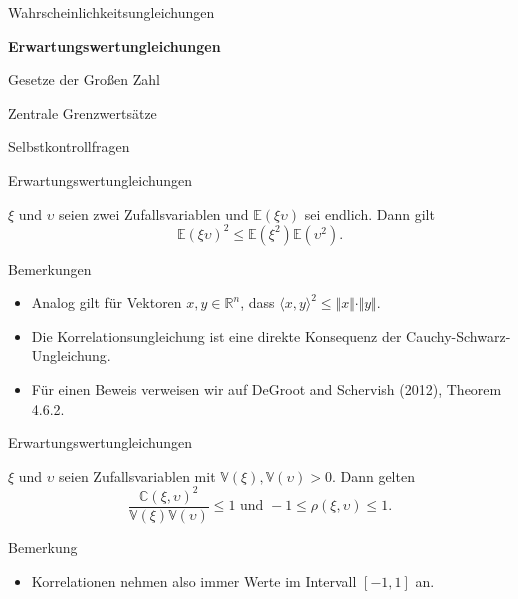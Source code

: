 \documentclass[
  8pt,
  ignorenonframetext,
]{beamer}
\providecommand{\tightlist}{%
  \setlength{\itemsep}{0pt}\setlength{\parskip}{0pt}}
\newcommand{\ups}{\upsilon}
\begin{document}
\begin{frame}{}
\protect\hypertarget{section-4}{}
\large
\vfill
{}

Wahrscheinlichkeitsungleichungen

\textbf{Erwartungswertungleichungen}

Gesetze der Großen Zahl

Zentrale Grenzwertsätze

Selbstkontrollfragen \vfill
\end{frame}

\begin{frame}{Erwartungswertungleichungen}
\protect\hypertarget{erwartungswertungleichungen}{}
\small
\begin{theorem}
\normalfont
\justifying
$\xi$ und $\ups$ seien zwei Zufallsvariablen und $\mathbb{E}(\xi\ups)$ sei endlich.
Dann gilt
\begin{equation}
\mathbb{E}(\xi\ups)^2 \le \mathbb{E}\left(\xi^2\right)\mathbb{E}\left(\ups^2 \right).
\end{equation}
\end{theorem}

Bemerkungen

\begin{itemize}
\tightlist
\item
  Analog gilt für Vektoren \(x,y \in \mathbb{R}^n\), dass
  \(\langle x,y \rangle^2 \le \Vert x \Vert \cdot \Vert y \Vert\).
\item
  Die Korrelationsungleichung ist eine direkte Konsequenz der
  Cauchy-Schwarz-Ungleichung.
\item
  Für einen Beweis verweisen wir auf DeGroot and Schervish (2012),
  Theorem 4.6.2.
\end{itemize}
\end{frame}

\begin{frame}{Erwartungswertungleichungen}
\protect\hypertarget{erwartungswertungleichungen-1}{}
\small
\begin{theorem}[Korrelationsungleichung]
\justifying
\normalfont
$\xi$ und $\ups$ seien Zufallsvariablen mit $\mathbb{V}(\xi), \mathbb{V}(\ups) > 0$. Dann gelten
\begin{equation}
\frac{\mathbb{C}(\xi,\ups)^2}{\mathbb{V}(\xi)\mathbb{V}(\ups)} \le 1
\mbox{ und }
-1 \le \rho(\xi,\ups) \le 1.
\end{equation}
\end{theorem}

Bemerkung

\begin{itemize}
\tightlist
\item
  Korrelationen nehmen also immer Werte im Intervall \([-1,1]\) an.
\end{itemize}
\end{frame}
\end{document}
